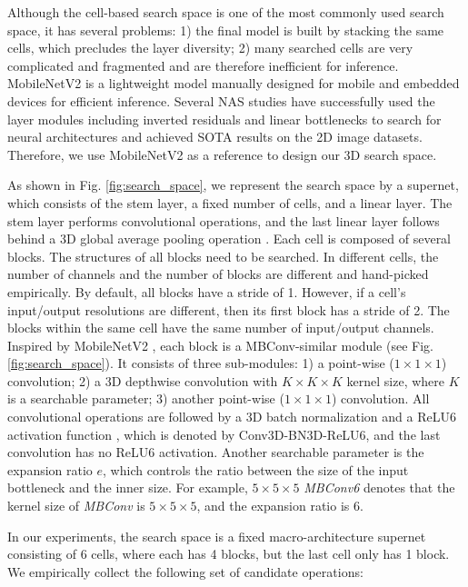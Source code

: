 \documentclass[letterpaper]{article}
\begin{document}
Although the cell-based search space \cite{enas,darts} is one of the most commonly used search space, it has several problems: 1) the final model is built by stacking the same cells, which precludes the layer diversity; 2) many searched cells are very complicated and fragmented and are therefore inefficient for inference. MobileNetV2 \cite{mobilenetv2} is a lightweight model manually designed for mobile and embedded devices for efficient inference. Several NAS studies \cite{mnasnet,fbnet} have successfully used the layer modules \cite{mobilenetv2} including inverted residuals and linear bottlenecks to search for neural architectures and achieved SOTA results on the 2D image datasets. Therefore, we use MobileNetV2 as a reference to design our 3D search space.

As shown in Fig. \ref{fig:search_space}, we represent the search space by a supernet, which consists of the stem layer, a fixed number of cells, and a linear layer. The stem layer performs convolutional operations, and the last linear layer follows behind a 3D global average pooling operation \cite{cam}. Each cell is composed of several blocks. The structures of all blocks need to be searched. In different cells, the number of channels and the number of blocks are different and hand-picked empirically. By default, all blocks have a stride of 1. However, if a cell's input/output resolutions are different, then its first block has a stride of 2. The blocks within the same cell have the same number of input/output channels. Inspired by MobileNetV2 \cite{mobilenetv2}, each block is a MBConv-similar module (see Fig. \ref{fig:search_space}). It consists of three sub-modules: 1) a point-wise ($1\times1\times1$) convolution; 2) a 3D depthwise convolution with $K\times K\times K$ kernel size, where $K$ is a searchable parameter; 3) another point-wise ($1\times1\times1$) convolution. All convolutional operations are followed by a 3D batch normalization and a ReLU6 activation function \cite{relu6}, which is denoted by Conv3D-BN3D-ReLU6, and the last convolution has no ReLU6 activation. Another searchable parameter is the expansion ratio $e$, which controls the ratio between the size of the input bottleneck and the inner size. For example, $5\times5\times5$ \textit{MBConv6} denotes that the kernel size of \textit{MBConv} is $5\times5\times5$, and the expansion ratio is 6.

In our experiments, the search space is a fixed macro-architecture supernet consisting of 6 cells, where each has 4 blocks, but the last cell only has 1 block. We empirically collect the following set of candidate operations:
\end{document}
